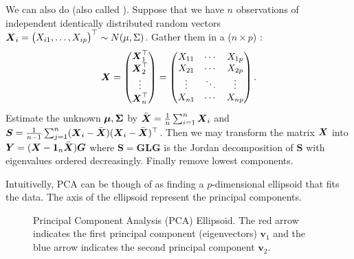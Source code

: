 We can also do  (also called ). Suppose that we have $n$ observations of independent identically distributed random vectors
$
    \boldsymbol{X}_i = \begin{pmatrix}
    X_{i1}, \ldots, X_{ip}
    \end{pmatrix}^\top \sim N(\mu, \Sigma)
$.
Gather them in a ($n\times p$) :
$$
    \boldsymbol{X} = \begin{pmatrix}
    \boldsymbol{X}_1^\top \\
    \boldsymbol{X}_2^\top \\
    \vdots \\
    \boldsymbol{X}_n^\top
    \end{pmatrix}
    = \begin{pmatrix}
    X_{11} & \cdots & X_{1p} \\
    X_{21} & \cdots & X_{2p} \\
    \vdots & \ddots & \vdots \\
    X_{n1} & \cdots & X_{np}
    \end{pmatrix}.
$$
Estimate the unknown $\boldsymbol{\mu}, \boldsymbol{\Sigma}$ by $\bar{\boldsymbol{X}} = \frac{1}{n} \sum_{i=1}^n \boldsymbol{X}_i$ and $\boldsymbol{S} = \frac{1}{n-1} \sum_{j=1}^n (\boldsymbol{X}_i-\bar{\boldsymbol{X}})(\boldsymbol{X}_i-\bar{\boldsymbol{X}})^\top$. Then we may transform the matrix $\boldsymbol{X}$ into $\boldsymbol{Y}=(\boldsymbol{X}-\boldsymbol{1}_n \bar{\boldsymbol{X}})\boldsymbol{G}$ where $\boldsymbol{S}=\boldsymbol{G}\boldsymbol{L}\boldsymbol{G}$ is the Jordan decomposition of $\boldsymbol{S}$ with eigenvalues ordered decreasingly. Finally remove lowest components. 

\begin{remark}
    Intuitivelly, PCA can be though of as finding a $p$-dimensional ellipsoid that fits the data. The axis of the ellipsoid represent the principal components.

    \begin{figure}[H]
        \centering
        \caption{Principal Component Analysis (PCA) Ellipsoid. The red arrow indicates the first principal component (eigenvectors) $\mathbf{v}_1$ and the blue arrow indicates the second principal component $\mathbf{v}_2$.}
        \label{fig:pca_ellipsoid}
    \end{figure}
    
\end{remark}

